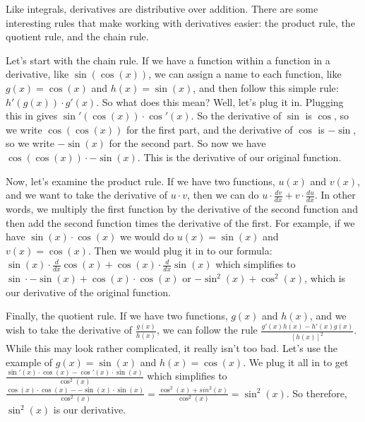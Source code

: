 Like integrals, derivatives are distributive over addition.
There are some interesting rules that make working with derivatives easier: the product rule, the quotient rule, and the chain rule. 

Let's start with the chain rule. 
If we have a function within a function in a derivative, like $\sin(\cos(x))$, we can assign a name to each function, like $g(x) = \cos(x)$ and $h(x) = \sin(x)$, and then follow this simple rule: $h'(g(x)) \cdot g'(x)$. 
So what does this mean? 
Well, let's plug it in. 
Plugging this in gives $\sin'(\cos(x)) \cdot \cos'(x)$. 
So the derivative of $\sin$ is $\cos$, so we write $\cos(\cos(x))$ for the first part, and the derivative of $\cos$ is $-\sin$, so we write $-\sin(x)$ for the second part. 
So now we have $\cos(\cos(x)) \cdot -\sin(x)$. 
This is the derivative of our original function.

Now, let's examine the product rule. 
If we have two functions, $u(x)$ and $v(x)$, and we want to take the derivative of $u\cdot v$, then we can do $u \cdot \frac{dv}{dx}+ v\cdot\frac{du}{dx}$. 
In other words, we multiply the first function by the derivative of the second function and then add the second function times the derivative of the first. 
For example, if we have $\sin(x)\cdot\cos(x)$ we would do $u(x) = \sin(x)$ and $v(x) = \cos(x)$. 
Then we would plug it in to our formula: $\sin(x)\cdot\frac{d}{dx}\cos(x) + \cos(x)\cdot\frac{d}{dx}\sin(x)$ which simplifies to $\sin\cdot -\sin(x) + \cos(x)\cdot\cos(x)$ or $-\sin^2(x)+\cos^2(x)$, which is our derivative of the original function.

Finally, the quotient rule. 
If we have two functions, $g(x)$ and $h(x)$, and we wish to take the derivative of $\frac{g(x)}{h(x)}$, we can follow the rule $\frac{g'(x)h(x)-h'(x)g(x)}{[h(x)]^2}$. 
While this may look rather complicated, it really isn't too bad. 
Let's use the example of $g(x) = \sin(x)$ and $h(x) = \cos(x)$. 
We plug it all in to get $\frac{\sin'(x)\cdot\cos(x) -\cos'(x)\cdot\sin(x)}{\cos^2(x)}$
which simplifies to $\frac{\cos(x)\cdot\cos(x)--\sin(x)\cdot\sin(x)}{\cos^2(x)} = \frac{\cos^2(x)+sin^2(x)}{\cos^2(x)} = \sin^2(x)$. 
So therefore, $\sin^2(x)$ is our derivative.


